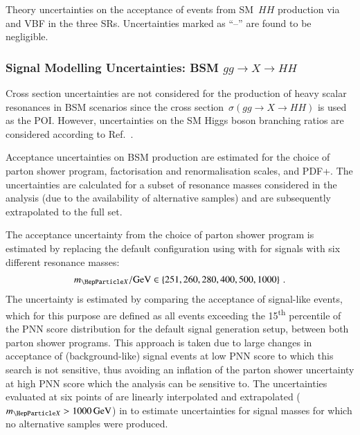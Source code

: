 \begin{table}[htbp]
  \centering

  \caption{Theory uncertainties on the acceptance of events from SM~$HH$
    production via \ggF and VBF in the three SRs. Uncertainties marked as ``--''
    are found to be negligible.}%
  \label{tab:theory_uncertainty_signal}

  
\end{table}


\subsubsection{Signal Modelling Uncertainties: BSM $gg \to X \to HH$}

Cross section uncertainties are not considered for the production of heavy
scalar resonances in BSM scenarios since the cross
section~$\sigma(gg \to X \to HH)$ is used as the POI. However, uncertainties on
the SM Higgs boson branching ratios are considered according to
Ref.~\cite{deFlorian:2016spz}.

Acceptance uncertainties on BSM \HH production are estimated for the choice of
parton shower program, factorisation and renormalisation scales, and
PDF+\alphas. The uncertainties are calculated for a subset of resonance masses
considered in the analysis (due to the availability of alternative samples) and
are subsequently extrapolated to the full set.

The acceptance uncertainty from the choice of parton shower program is estimated
by replacing the default configuration using \HERWIG[7.1.3] with \PYTHIA[8.235]
for signals with six different resonance masses:
\begin{align*}
  \mX / \si{\GeV} \in \left\{ 251, 260, 280, 400, 500, 1000
  \right\} \,\text{.}
\end{align*}
The uncertainty is estimated by comparing the acceptance of signal-like events,
which for this purpose are defined as all events exceeding the
15\textsuperscript{th} percentile of the PNN score distribution for the default
signal generation setup, between both parton shower programs. This approach is
taken due to large changes in acceptance of (background-like) signal events at
low PNN score to which this search is not sensitive, thus avoiding an inflation
of the parton shower uncertainty at high PNN score which the analysis can be
sensitive to. The uncertainties evaluated at six points of \mX are linearly
interpolated and extrapolated ($\mX > \SI{1000}{\GeV}$) in \mX to estimate
uncertainties for signal masses for which no alternative samples were produced.

